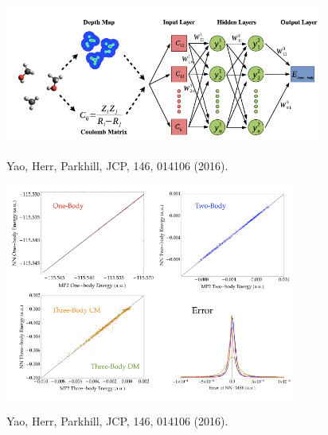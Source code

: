 \documentclass[handout]{beamer} %
\begin{document}
\begin{frame}
\begin{center}
\includegraphics[height=1.8in]{figures_ml/parkhill_nn.png}
\end{center}
\vspace{10mm}
\begin{center}
\footnotesize{Yao, Herr, Parkhill, JCP, 146, 014106 (2016).}
\end{center} 
\end{frame}

\begin{frame}
\begin{center}
\includegraphics[height=2.8in]{figures_ml/parkhill_scatter.png}
\end{center}

\vspace{-1mm}
\begin{center}
\footnotesize{Yao, Herr, Parkhill, JCP, 146, 014106 (2016).}
\end{center} 
\end{frame}
\end{document}
